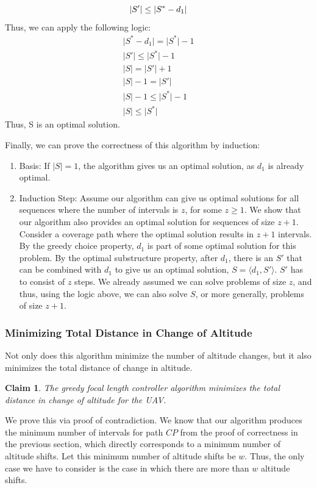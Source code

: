 \documentclass[conference]{IEEEtran}
\theoremstyle{plain}%
\newtheorem{claim}[theorem]{Claim}
\begin{document}
\begin{equation*}
\lvert S' \rvert \leq \lvert S^* - d_1 \rvert \\
\end{equation*}
Thus, we can apply the following logic:
\begin{gather*}
\lvert S^* - d_1 \rvert = \lvert S^* \rvert -1 \\
\lvert S' \rvert \leq \lvert S^* \rvert -1 \\
\lvert S \rvert = \lvert S' \rvert + 1 \\
\lvert S \rvert -1 = \lvert S' \rvert \\
\lvert S \rvert -1 \leq \lvert S^* \rvert -1 \\
\lvert S \rvert \leq \lvert S^* \rvert 
\end{gather*}
Thus, S is an optimal solution.

Finally, we can prove the correctness of this algorithm by induction:
\begin{enumerate}
\item Basis: If $\lvert S \rvert = 1$, the algorithm gives us an optimal solution, as $d_1$ is already optimal.
\item Induction Step: Assume our algorithm can give us optimal solutions for all sequences where the number of intervals is $z$, for some $z \geq 1$. We show that our algorithm also provides an optimal solution for sequences of size $z+1$. Consider a coverage path where the optimal solution results in $z+1$ intervals. By the greedy choice property, $d_1$ is part of some optimal solution for this problem. By the optimal substructure property, after $d_1$, there is an $S'$ that can be combined with $d_1$ to give us an optimal solution, $S=\langle d_1, S' \rangle$. $S'$ has to consist of $z$ steps. We already assumed we can solve problems of size $z$, and thus, using the logic above, we can also solve $S$, or more generally, problems of size $z+1$.
\end{enumerate}

\subsubsection{Minimizing Total Distance in Change of Altitude}
Not only does this algorithm minimize the number of altitude changes, but it also minimizes the total distance of change in altitude.
\begin{claim} %
The greedy focal length controller algorithm minimizes the total distance in change of altitude for the UAV.
\end{claim}
We prove this via proof of contradiction. We know that our algorithm produces the minimum number of intervals for path $CP$ from the proof of correctness in the previous section, which directly corresponds to a minimum number of altitude shifts. Let this minimum number of altitude shifts be $w$. Thus, the only case we have to consider is the case in which there are more than $w$ altitude shifts.
\end{document}
